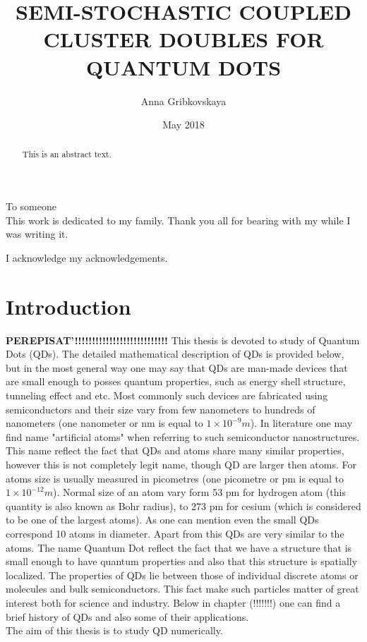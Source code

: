 \documentclass[twoside,english]{uiofysmaster}
\author{Anna Gribkovskaya}
\title{\uppercase{Semi-stochastic Coupled Cluster Doubles for Quantum Dots}}
\date{May 2018}
\theoremstyle{definition}
\begin{document}
\begin{titlepage}
\maketitle
\end{titlepage}
\begin{abstract}
	This is an abstract text.
\end{abstract}

\begin{dedication}
	To someone
	\\\vspace{12pt}
	This work is dedicated to my family. Thank you all for bearing with my while I was writing it.
\end{dedication}
\begin{acknowledgements}
	I acknowledge my acknowledgements.
\end{acknowledgements}
\tableofcontents

\chapter*{Introduction}
\textbf{PEREPISAT'!!!!!!!!!!!!!!!!!!!!!!!!!!!}
This thesis is devoted to study of Quantum Dots (QDs). The detailed mathematical description of QDs is provided below, but in the most general way one may say that QDs are man-made devices that are small enough to posses quantum properties, such as energy shell structure, tunneling effect and etc. Most commonly such devices are fabricated using semiconductors and their size vary from few nanometers to hundreds of nanometers (one nanometer or nm is equal to $1\times 10^{-9} m$). In literature one may find name "artificial atoms" when referring to such  semiconductor nanostructures. This name reflect the fact that QDs and atoms share many similar properties, however this is not completely legit name, though QD are larger then atoms. For atoms size is usually measured in picometres  (one picometre or pm is equal to $1\times 10^{-12} m$).  Normal size of an atom vary form 53 pm for hydrogen atom (this quantity is also known as Bohr radius), to  273 pm for cesium (which is considered to be one of the largest atoms). As one can mention even the small QDs correspond 10 atoms in diameter. Apart from this QDs are very similar to the atoms. The name Quantum Dot reflect the fact that we have a structure that is small enough to have quantum properties and also that this structure is spatially localized. The properties of QDs lie between those of individual discrete atoms or molecules and bulk semiconductors. This fact make such particles matter of great interest both for science and industry. Below in chapter (!!!!!!!) one can find a brief history of QDs and also  some of their applications.  \\
The aim of this thesis is to study QD numerically. 
\end{document}
